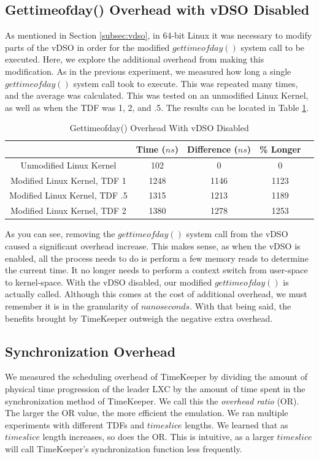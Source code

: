 \subsection{Gettimeofday() Overhead with vDSO Disabled}
\label{sec:expvdso}
As mentioned in Section \ref{subsec:vdso}, in 64-bit Linux it was necessary to modify parts of the vDSO in order for the modified $gettimeofday()$ system call to be executed. Here, we explore the additional overhead from making this modification. As in the previous experiment, we measured how long a single $gettimeofday()$ system call took to execute. This was repeated many times, and the average was calculated. This was tested on an unmodified Linux Kernel, as well as when the TDF was 1, 2, and .5. The results can be located in Table \ref{table:gtodvdso}.
\begin{table} \centering 
\begin{tabular}{|c|c|c|c|c|} 
        \hline 
         & Time ($ns$) & Difference ($ns$) & \% Longer \\ \hline 
        Unmodified Linux Kernel & 102 & 0 &  0 \\ \hline 
        Modified Linux Kernel, TDF 1 &  1248 & 1146 & 1123 \\ \hline 
        Modified Linux Kernel, TDF .5 & 1315 & 1213 & 1189 \\ \hline 
        Modified Linux Kernel, TDF 2 & 1380 &  1278 & 1253 \\ \hline 
        \hline 
        \end{tabular} 
        \caption{Gettimeofday() Overhead With vDSO Disabled} 
        \label{table:gtodvdso} 
\end{table}
As you can see, removing the $gettimeofday()$ system call from the vDSO caused a significant overhead increase. This makes sense, as when the vDSO is enabled, all the process needs to do is perform a few memory reads to determine the current time. It no longer needs to perform a context switch from user-space to kernel-space. With the vDSO disabled, our modified $gettimeofday()$ is actually called. Although this comes at the cost of additional overhead, we must remember it is in the granularity of $nanoseconds$. With that being said, the benefits brought by TimeKeeper outweigh the negative extra overhead.
\subsection{Synchronization Overhead}
We measured the scheduling overhead of TimeKeeper by dividing the amount of physical time progression of the leader LXC by the amount of time spent in the synchronization method of TimeKeeper. We call this the {\em overhead ratio} (OR). The larger the OR value, the more efficient the emulation. We ran multiple experiments with different TDFs and $timeslice$ lengths. We learned that as $timeslice$ length increases, so does the OR. This is intuitive, as a larger $timeslice$ will call TimeKeeper's synchronization function less frequently. 

